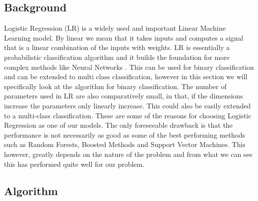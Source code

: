 \subsection{Background }
Logistic Regression (LR) is a widely used and important Linear Machine Learning model. By linear we mean that it takes inputs and computes a signal that is a linear combination of the inputs with weights. LR is essentially a probabilistic classification algorithm and it builds the foundation for more complex methods like Neural Networks \cite{40}. This can be used for binary classification and can be extended to multi class classification, however in this section we will specifically look at the algorithm for binary classification. The number of parameters used in LR are also comparatively small, in that, if the dimensions increase the parameters only linearly increase. This could also be easily extended to a multi-class classification. These are some of the reasons for choosing Logistic Regression as one of our models. The only foreseeable drawback is that the performance is not necessarily as good as some of the best performing methods such as Random Forests, Boosted Methods and Support Vector Machines. This however, greatly depends on the nature of the problem and from what we can see this has performed quite well for our problem. 

\subsection{Algorithm}

